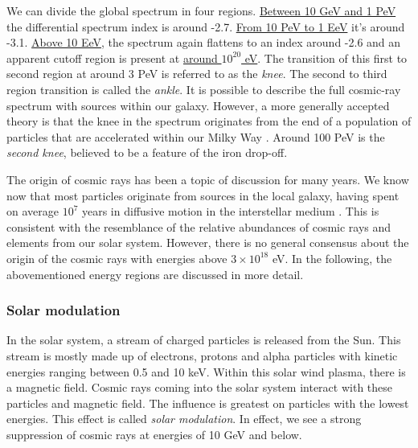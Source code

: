 We can divide the global spectrum in four regions. \underline{Between 10 GeV and 1 PeV} the differential spectrum index is around -2.7. \underline{From 10 PeV to 1 EeV} it's around -3.1. \underline{Above 10 EeV}, the spectrum again flattens to an index around -2.6 and an apparent cutoff region is present at  \underline{around $10^{20}$ eV}. The transition of this first to second region at around 3 PeV is referred to as the \textit{knee}. The second to third region transition is called the \textit{ankle}. It is possible to describe the full cosmic-ray spectrum with sources within our galaxy. However, a more generally accepted theory is that the knee in the spectrum originates from the end of a population of particles that are accelerated within our Milky Way \cite{Gaisser:2013bla}. Around 100 PeV is the \textit{second knee}, believed to be a feature of the iron drop-off.

The origin of cosmic rays has been a topic of discussion for many years. We know now that most particles originate from sources in the local galaxy, having spent on average $10^7$ years in diffusive motion in the interstellar medium \cite{Gaisser:2013bla}. This is consistent with the resemblance of the relative abundances of cosmic rays and elements from our solar system. However, there is no general consensus about the origin of the cosmic rays with energies above $3 \times 10^{18}$ eV. In the following, the abovementioned energy regions are discussed in more detail.

\subsubsection{Solar modulation}
In the solar system, a stream of charged particles is released from the Sun. This stream is mostly made up of electrons, protons and alpha particles with kinetic energies ranging between 0.5 and 10 keV. Within this solar wind plasma, there is a magnetic field. Cosmic rays coming into the solar system interact with these particles and magnetic field. The influence is greatest on particles with the lowest energies. This effect is called \textit{solar modulation}. In effect, we see a strong suppression of cosmic rays at energies of 10 GeV and below.

